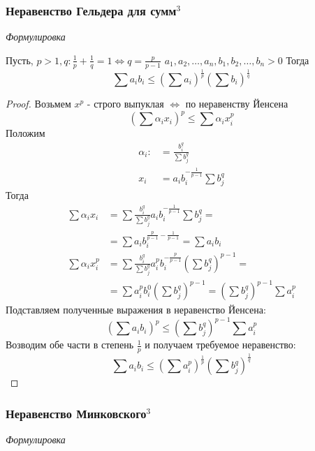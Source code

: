 \documentclass{article}
\begin{document}
\subsubsection{Неравенство Гельдера для сумм\texorpdfstring{$^3$}{}}
\textit{Формулировка}

Пусть, $p > 1, q: \frac{1} {p} + \frac{1} {q} = 1 \Leftrightarrow q = \frac{p} {p - 1}$
$a_1, a_2, \dots, a_n, b_1, b_2, \dots, b_n > 0$
Тогда
\begin{equation*}
\sum a_i b_i \leq \left(\sum a_i\right)^\frac{1}{p} \left(\sum b_i\right)^\frac{1} {q}
\end{equation*}
\begin{proof}
Возьмем $x^p$ - строго выпуклая $\Leftrightarrow$ по неравенству Йенсена 
\begin{equation*}
\left(\sum \alpha_i x_i\right)^p \leq \sum \alpha_i x_i^p
\end{equation*}
Положим
\begin{align*}
\alpha_i :&= \frac{b_i^q} {\sum b_j^q}\\
x_i &= a_i b_i^{-\frac {1} {p - 1}} \sum b_j^q
\end{align*}
Тогда 
\begin{align*}
\sum \alpha_i x_i &= \sum \frac{b_i^q} {\sum b_j^q} a_i b_i^{-\frac {1} {p - 1}} \sum b_j^q = \\
&= \sum a_i b_i^{\frac{p} {p - 1} - \frac{1} {p - 1}} = \sum a_i b_i\\
\sum \alpha_i x_i^p &= \sum \frac{b_i^q} {\sum{b_j^q}} a_i^p b_i^{-\frac{p} {p - 1}}\left( \sum b_j^q\right) ^{p - 1} = \\
&= \sum a_i^p b_i^0 \left(\sum b_j^q\right)^{p - 1} = \left(\sum b_j^q\right)^{p - 1} \sum a_i^p
\end{align*}
Подставляем полученные выражения в неравенство Йенсена:
\begin{equation*}
\left(\sum a_i b_i\right)^p \leq \left(\sum b_j^q\right)^{p - 1} \sum a_i^p
\end{equation*}
Возводим обе части в степень $\frac{1} {p}$ и получаем требуемое неравенство:
\begin{equation*}
\sum a_i b_i \leq \left(\sum a_i^p\right)^\frac{1} {p} \left(\sum b_j^q\right)^\frac{1} {q}
\end{equation*}
\end{proof}

\subsubsection{Неравенство Минковского\texorpdfstring{$^3$}{}}
\textit{Формулировка}
\end{document}
